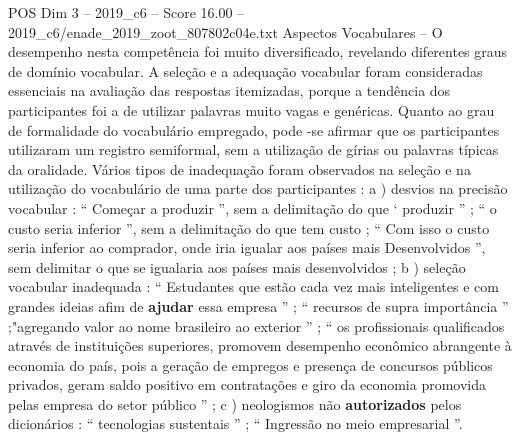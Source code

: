\begin{textsample}{POS Dim 3 – 2019\_c6 – Score 16.00 – 2019\_c6/enade\_2019\_zoot\_807802c04e.txt}
Aspectos Vocabulares – O desempenho nesta competência foi muito diversificado, revelando diferentes graus de domínio vocabular.
A seleção e a adequação vocabular foram consideradas essenciais na avaliação das respostas itemizadas, porque a tendência dos participantes foi a de utilizar palavras muito vagas e genéricas.
Quanto ao grau de formalidade do vocabulário empregado, pode -se afirmar que os participantes utilizaram um registro semiformal, sem a utilização de gírias ou palavras típicas da oralidade.
Vários tipos de inadequação foram observados na seleção e na utilização do vocabulário de uma parte dos participantes : a ) desvios na precisão vocabular : “ Começar a produzir ”, sem a delimitação do que ‘ produzir ” ; “ o custo seria inferior ”, sem a delimitação do que tem custo ; “ Com isso o custo seria inferior ao comprador, onde iria igualar aos países mais Desenvolvidos ”, sem delimitar o que se igualaria aos países mais desenvolvidos ; b ) seleção vocabular inadequada : “ Estudantes que estão cada vez mais inteligentes e com grandes ideias afim de \textbf{ajudar} essa empresa ” ; “ recursos de supra importância ” ;"agregando valor ao nome brasileiro ao exterior ” ; “ os profissionais qualificados através de instituições superiores, promovem desempenho econômico abrangente à economia do país, pois a geração de empregos e presença de concursos públicos privados, geram saldo positivo em contratações e giro da economia promovida pelas empresa do setor público ” ; c ) neologismos não \textbf{autorizados} pelos dicionários : “ tecnologias sustentais ” ; “ Ingressão no meio empresarial ”.

\end{textsample}
